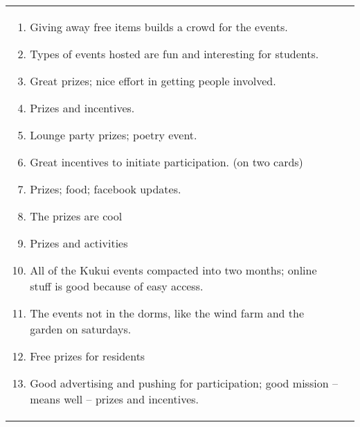 \documentclass[]{IEEEconf}
\begin{document}
\begin{figure*}[th!]
\begin{tabular}{|l|l|}
\begin{minipage}[t]{2.6in}
\begin{enumerate}
\item 	Giving away free items builds a crowd for the events. 
\item 	Types of events hosted are fun and interesting for students.
\item 	Great prizes; nice effort in getting people involved.
\item 	Prizes and incentives.
\item 	Lounge party prizes; poetry event.
\item 	Great incentives to initiate participation. (on two cards)
\item 	Prizes; food; facebook updates.
\item 	The prizes are cool
\item 	Prizes and activities
\item 	All of the Kukui events compacted into two months; online stuff is good because of easy access.
\item 	The events not in the dorms, like the wind farm and the garden on saturdays.
\item 	Free prizes for residents
\item 	Good advertising and pushing for participation; good mission -- means well -- prizes and incentives. 
\end{enumerate}
\end{minipage}  \normalsize

&


\end{tabular}
\end{figure*}
\end{document}
